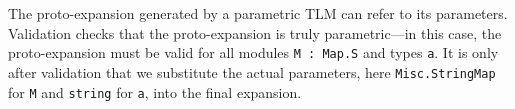 \documentclass[acmsmall,screen]{acmart}
\newcommand{\li}[1]{\lstinline[basicstyle=\ttfamily\fontsize{9pt}{1em}\selectfont]{#1}}
\begin{document}

The proto-expansion generated by a parametric TLM can refer to its parameters. Validation checks that the proto-expansion is truly parametric---in this case, the proto-expansion must be valid for all modules \li{M : Map.S} and types \li{a}. It is only after validation that we substitute the actual parameters, here \li{Misc.StringMap} for \li{M} and \li{string} for \li{a}, into the final expansion. 


\end{document}
